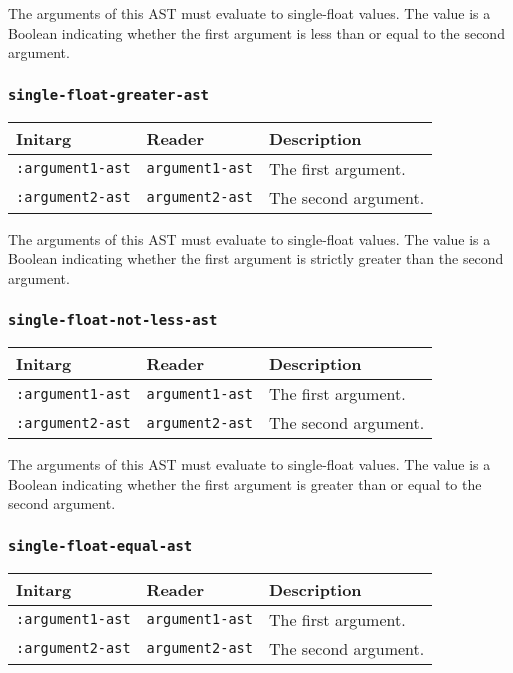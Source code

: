 The arguments of this AST must evaluate to single-float
values.  The value is a Boolean indicating whether the first argument
is less than or equal to the second argument.

\subsubsection{\texttt{single-float-greater-ast}}
\label{sec-ast-single-float-greater}

\begin{tabular}{|l|l|l|}
\hline
Initarg & Reader & Description\\
\hline\hline
\texttt{:argument1-ast} & \texttt{argument1-ast} & The first argument.\\
\hline
\texttt{:argument2-ast} & \texttt{argument2-ast} & The second argument.\\
\hline
\end{tabular}

The arguments of this AST must evaluate to single-float
values.  The value is a Boolean indicating whether the first argument
is strictly greater than the second argument.

\subsubsection{\texttt{single-float-not-less-ast}}
\label{sec-ast-single-float-not-less}

\begin{tabular}{|l|l|l|}
\hline
Initarg & Reader & Description\\
\hline\hline
\texttt{:argument1-ast} & \texttt{argument1-ast} & The first argument.\\
\hline
\texttt{:argument2-ast} & \texttt{argument2-ast} & The second argument.\\
\hline
\end{tabular}

The arguments of this AST must evaluate to single-float
values.  The value is a Boolean indicating whether the first argument
is greater than or equal to the second argument.

\subsubsection{\texttt{single-float-equal-ast}}
\label{sec-ast-single-float-equal}

\begin{tabular}{|l|l|l|}
\hline
Initarg & Reader & Description\\
\hline\hline
\texttt{:argument1-ast} & \texttt{argument1-ast} & The first argument.\\
\hline
\texttt{:argument2-ast} & \texttt{argument2-ast} & The second argument.\\
\hline
\end{tabular}

